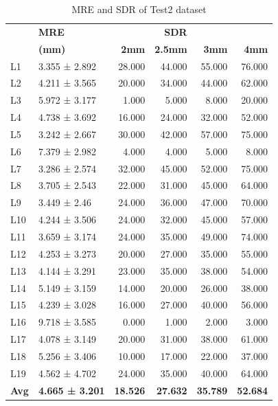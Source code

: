 \documentclass[sn-mathphys]{sn-jnl}%
\theoremstyle{thmstyleone}%
\theoremstyle{thmstyletwo}%
\theoremstyle{thmstylethree}%
\begin{document}
 \begin{table}[ht!]
 \centering
 \begin{tabular}{llrrrr}
\toprule
 &                \textbf{MRE}         &            &  \textbf{SDR} &\\
    &             \textbf{(mm)}&       \textbf{2mm} &       \textbf{2.5mm} &       \textbf{3mm}&       \textbf{4mm} \\
\midrule
  L1 &  3.355 ± 2.892 &  28.000 &  44.000 &  55.000 &  76.000 \\
  L2 &  4.211 ± 3.565 &  20.000 &  34.000 &  44.000 &  62.000 \\
  L3 &  5.972 ± 3.177 &   1.000 &   5.000 &   8.000 &  20.000 \\
  L4 &  4.738 ± 3.692 &  16.000 &  24.000 &  32.000 &  52.000 \\
  L5 &  3.242 ± 2.667 &  30.000 &  42.000 &  57.000 &  75.000 \\
  L6 &  7.379 ± 2.982 &   4.000 &   4.000 &   5.000 &   8.000 \\
  L7 &  3.286 ± 2.574 &  32.000 &  45.000 &  52.000 &  75.000 \\
  L8 &  3.705 ± 2.543 &  22.000 &  31.000 &  45.000 &  64.000 \\
  L9 &   3.449 ± 2.46 &  24.000 &  36.000 &  47.000 &  70.000 \\
 L10 &  4.244 ± 3.506 &  24.000 &  32.000 &  45.000 &  57.000 \\
 L11 &  3.659 ± 3.174 &  24.000 &  35.000 &  49.000 &  74.000 \\
 L12 &  4.253 ± 3.273 &  20.000 &  27.000 &  35.000 &  55.000 \\
 L13 &  4.144 ± 3.291 &  23.000 &  35.000 &  38.000 &  54.000 \\
 L14 &  5.149 ± 3.159 &  14.000 &  20.000 &  26.000 &  38.000 \\
 L15 &  4.239 ± 3.028 &  16.000 &  27.000 &  40.000 &  56.000 \\
 L16 &  9.718 ± 3.585 &   0.000 &   1.000 &   2.000 &   3.000 \\
 L17 &  4.078 ± 3.149 &  20.000 &  31.000 &  38.000 &  61.000 \\
 L18 &  5.256 ± 3.406 &  10.000 &  17.000 &  22.000 &  37.000 \\
 L19 &  4.562 ± 4.702 &  24.000 &  35.000 &  40.000 &  64.000 \\
 \textbf{Avg} &  \textbf{4.665 ± 3.201} &  \textbf{18.526} &  \textbf{27.632} &  \textbf{35.789} &  \textbf{52.684} \\
\bottomrule
\end{tabular}
\caption{MRE and SDR of Test2 dataset}
\label{table:4.2}
\end{table}
 
\end{document}
